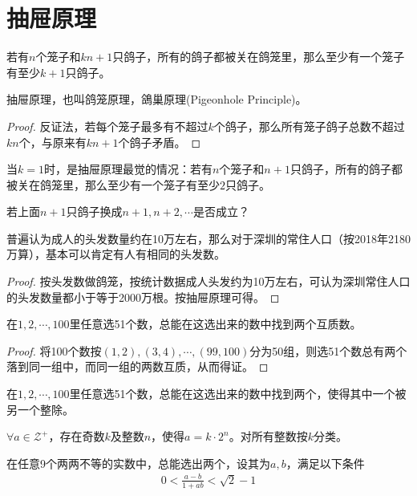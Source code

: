 
\chapter{抽屉原理}
\label{chap:pigeonhole-principle}

\begin{theorem}[抽屉原理]
  若有$n$个笼子和$kn+1$只鸽子，所有的鸽子都被关在鸽笼里，那么至少有一个笼子有至少$k+1$只鸽子。
\end{theorem}

抽屉原理，也叫鸽笼原理，鴿巢原理(Pigeonhole Principle)。

\begin{proof}
  反证法，若每个笼子最多有不超过$k$个鸽子，那么所有笼子鸽子总数不超过$kn$个，与原来有$kn+1$个鸽子矛盾。
\end{proof}

当$k=1$时，是抽屉原理最觉的情况：若有$n$个笼子和$n+1$只鸽子，所有的鸽子都被关在鸽笼里，那么至少有一个笼子有至少$2$只鸽子。

\think 若上面$n+1$只鸽子换成$n+1,n+2,\cdots$是否成立？

\begin{example}
  普遍认为成人的头发数量约在10万左右，那么对于深圳的常住人口（按2018年2180万算），基本可以肯定有人有相同的头发数。
\end{example}

\begin{proof}
  按头发数做鸽笼，按统计数据成人头发约为10万左右，可认为深圳常住人口的头发数量都小于等于2000万根。按抽屉原理可得。
\end{proof}

\begin{example}
  在$1,2,\cdots,100$里任意选51个数，总能在这选出来的数中找到两个互质数。
\end{example}

\begin{proof}
  将100个数按$(1,2), (3,4), \cdots, (99,100)$分为50组，则选51个数总有两个落到同一组中，而同一组的两数互质，从而得证。
\end{proof}

\begin{question}
  在$1,2,\cdots,100$里任意选51个数，总能在这选出来的数中找到两个，使得其中一个被另一个整除。
\end{question}
\hints $\forall a\in\mathcal{Z}^+$，存在奇数$k$及整数$n$，使得$a=k\cdot 2^n$。对所有整数按$k$分类。

\begin{example}
  在任意9个两两不等的实数中，总能选出两个，设其为$a,b$，满足以下条件
  \begin{align*}
    0 < \frac{a-b}{1+ab} < \sqrt2 -1
  \end{align*}
\end{example}

